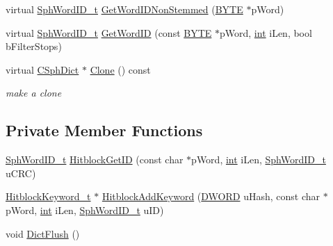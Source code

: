 \begin{DoxyCompactItemize}
\item 
virtual \hyperlink{sphinx_8h_a80a94d5984fdf9214a98f3e5e65df963}{Sph\-Word\-I\-D\-\_\-t} \hyperlink{classCSphDictKeywords_a80398f482f7dc9a68dbd50f2d0bd9e9c}{Get\-Word\-I\-D\-Non\-Stemmed} (\hyperlink{sphinxstd_8h_a4ae1dab0fb4b072a66584546209e7d58}{B\-Y\-T\-E} $\ast$p\-Word)
\item 
virtual \hyperlink{sphinx_8h_a80a94d5984fdf9214a98f3e5e65df963}{Sph\-Word\-I\-D\-\_\-t} \hyperlink{classCSphDictKeywords_a91a7939068a6c22af7ac86decb124e6b}{Get\-Word\-I\-D} (const \hyperlink{sphinxstd_8h_a4ae1dab0fb4b072a66584546209e7d58}{B\-Y\-T\-E} $\ast$p\-Word, \hyperlink{sphinxexpr_8cpp_a4a26e8f9cb8b736e0c4cbf4d16de985e}{int} i\-Len, bool b\-Filter\-Stops)
\item 
virtual \hyperlink{classCSphDict}{C\-Sph\-Dict} $\ast$ \hyperlink{classCSphDictKeywords_ad1381761be17ac2293827e85e6cf1c79}{Clone} () const 
\begin{DoxyCompactList}\small\item\em make a clone \end{DoxyCompactList}\end{DoxyCompactItemize}
\subsection*{Private Member Functions}
\begin{DoxyCompactItemize}
\item 
\hyperlink{sphinx_8h_a80a94d5984fdf9214a98f3e5e65df963}{Sph\-Word\-I\-D\-\_\-t} \hyperlink{classCSphDictKeywords_a322696167f5a0bdae1c00659db53034d}{Hitblock\-Get\-I\-D} (const char $\ast$p\-Word, \hyperlink{sphinxexpr_8cpp_a4a26e8f9cb8b736e0c4cbf4d16de985e}{int} i\-Len, \hyperlink{sphinx_8h_a80a94d5984fdf9214a98f3e5e65df963}{Sph\-Word\-I\-D\-\_\-t} u\-C\-R\-C)
\item 
\hyperlink{structCSphDictKeywords_1_1HitblockKeyword__t}{Hitblock\-Keyword\-\_\-t} $\ast$ \hyperlink{classCSphDictKeywords_a0fd0e1a7ee944a3140356052e45e1e4a}{Hitblock\-Add\-Keyword} (\hyperlink{sphinxstd_8h_a798af1e30bc65f319c1a246cecf59e39}{D\-W\-O\-R\-D} u\-Hash, const char $\ast$p\-Word, \hyperlink{sphinxexpr_8cpp_a4a26e8f9cb8b736e0c4cbf4d16de985e}{int} i\-Len, \hyperlink{sphinx_8h_a80a94d5984fdf9214a98f3e5e65df963}{Sph\-Word\-I\-D\-\_\-t} u\-I\-D)
\item 
void \hyperlink{classCSphDictKeywords_ad1b13d9a3ea222b7ea93af36b59b5e68}{Dict\-Flush} ()
\end{DoxyCompactItemize}
